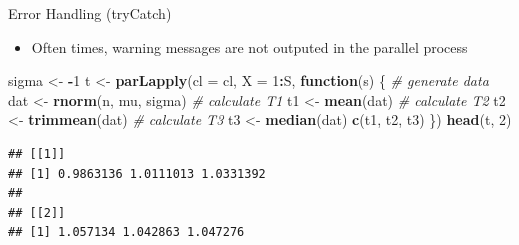 \documentclass[
  ignorenonframetext,
]{beamer}
\newenvironment{Shaded}{\begin{snugshade}}{\end{snugshade}}
\newcommand{\AttributeTok}[1]{\textcolor[rgb]{0.13,0.29,0.53}{#1}}
\newcommand{\CommentTok}[1]{\textcolor[rgb]{0.56,0.35,0.01}{\textit{#1}}}
\newcommand{\ControlFlowTok}[1]{\textcolor[rgb]{0.13,0.29,0.53}{\textbf{#1}}}
\newcommand{\DecValTok}[1]{\textcolor[rgb]{0.00,0.00,0.81}{#1}}
\newcommand{\FunctionTok}[1]{\textcolor[rgb]{0.13,0.29,0.53}{\textbf{#1}}}
\newcommand{\NormalTok}[1]{#1}
\newcommand{\OtherTok}[1]{\textcolor[rgb]{0.56,0.35,0.01}{#1}}
\newcommand{\SpecialCharTok}[1]{\textcolor[rgb]{0.81,0.36,0.00}{\textbf{#1}}}
\providecommand{\tightlist}{%
  \setlength{\itemsep}{0pt}\setlength{\parskip}{0pt}}
\begin{document}
\begin{frame}[fragile]{Error Handling (tryCatch)}
\protect{}\label{error-handling-trycatch-1}
\tiny

\begin{itemize}
\tightlist
\item
  Often times, warning messages are not outputed in the parallel process
\end{itemize}

\begin{Shaded}
\begin{Highlighting}[]
\NormalTok{sigma }\OtherTok{\textless{}{-}} \SpecialCharTok{{-}}\DecValTok{1}
\NormalTok{t }\OtherTok{\textless{}{-}} \FunctionTok{parLapply}\NormalTok{(}\AttributeTok{cl =}\NormalTok{ cl, }\AttributeTok{X =} \DecValTok{1}\SpecialCharTok{:}\NormalTok{S, }\ControlFlowTok{function}\NormalTok{(s) \{}
  \CommentTok{\# generate data}
\NormalTok{  dat }\OtherTok{\textless{}{-}} \FunctionTok{rnorm}\NormalTok{(n, mu, sigma)}
  \CommentTok{\# calculate T1}
\NormalTok{  t1 }\OtherTok{\textless{}{-}} \FunctionTok{mean}\NormalTok{(dat)}
  \CommentTok{\# calculate T2}
\NormalTok{  t2 }\OtherTok{\textless{}{-}} \FunctionTok{trimmean}\NormalTok{(dat)}
  \CommentTok{\# calculate T3}
\NormalTok{  t3 }\OtherTok{\textless{}{-}} \FunctionTok{median}\NormalTok{(dat)}
  \FunctionTok{c}\NormalTok{(t1, t2, t3)}
\NormalTok{\})}
\FunctionTok{head}\NormalTok{(t, }\DecValTok{2}\NormalTok{)}
\end{Highlighting}
\end{Shaded}

\begin{verbatim}
## [[1]]
## [1] 0.9863136 1.0111013 1.0331392
## 
## [[2]]
## [1] 1.057134 1.042863 1.047276
\end{verbatim}
\end{frame}
\end{document}
